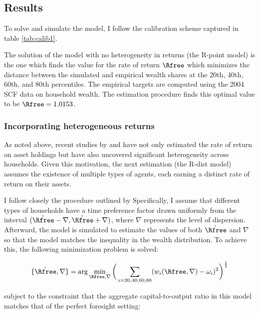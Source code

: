 \documentclass[\econtexRoot/Chp1proposal]{subfiles}
\begin{document}
\subsection{Results}
\par To solve and simulate the model, I follow the calibration scheme captured in table \ref{tab:calib1}.
\unskip

\par The solution of the model with no heterogeneity in returns (the R-point model) is the one which finds the value for the rate of return $\Rfree$ which minimizes the distance between the simulated and empirical wealth shares at the 20th, 40th, 60th, and 80th percentiles. The empirical targets are computed using the 2004 SCF data on household wealth. The estimation procedure finds this optimal value to be $\Rfree = 1.0153$.

\subsubsection{Incorporating heterogeneous returns}

\par As noted above, recent studies by \cite{aflgdmlp20} and \cite{lblcps18} have not only estimated the rate of return on asset holdings but have also uncovered significant heterogeneity across households. Given this motivation, the next estimation (the R-dist model) assumes the existence of multiple types of agents, each earning a distinct rate of return on their assets.

\par I follow closely the procedure outlined by \cite{cstw2017} Specifically, I assume that different types of households have a time preference factor drawn uniformly from the interval $(\grave{\Rfree} - \nabla, \grave{\Rfree} + \nabla)$, where $\nabla$ represents the level of dispersion. Afterward, the model is simulated to estimate the values of both $\grave{\Rfree}$ and $\nabla$ so that the model matches the inequality in the wealth distribution. To achieve this, the following minimization problem is solved:

$$ \{\grave{\Rfree}, \nabla\} = \text{arg}\min_{\Rfree, \nabla} \bigg( \sum_{i=20, 40, 60, 80} (w_{i}(\Rfree, \nabla)-\omega_i )^{2} \bigg)^{\frac{1}{2}} $$

\par subject to the constraint that the aggregate capital-to-output ratio in this model matches that of the perfect foresight setting:
\end{document}
